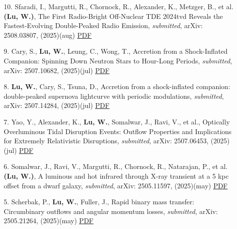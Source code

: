\begin{itemize}[leftmargin=0.65cm]
\vspace{-0.1cm}
\item[10.]{Sfaradi, I., Margutti, R., Chornock, R., Alexander, K., Metzger, B., et al. {\bf (Lu, W.)}, {The First Radio-Bright Off-Nuclear TDE 2024tvd Reveals the Fastest-Evolving Double-Peaked Radio Emission}, {\it submitted}, arXiv: 2508.03807, (2025)(aug) \href{https://ui.adsabs.harvard.edu/abs/2025arXiv250803807S}{\underline{PDF}}}

\vspace{-0.1cm}
\item[9.]{Cary, S., {\bf Lu, W.}, Leung, C., Wong, T., {Accretion from a Shock-Inflated Companion: Spinning Down Neutron Stars to Hour-Long Periods}, {\it submitted}, arXiv: 2507.10682, (2025)(jul) \href{https://ui.adsabs.harvard.edu/abs/2025arXiv250710682C}{\underline{PDF}}}

\vspace{-0.1cm}
\item[8.]{{\bf Lu, W.}, Cary, S., Tsuna, D., {Accretion from a shock-inflated companion: double-peaked supernova lightcurve with periodic modulations}, {\it submitted}, arXiv: 2507.14284, (2025)(jul) \href{https://ui.adsabs.harvard.edu/abs/2025arXiv250714284L}{\underline{PDF}}}

\vspace{-0.1cm}
\item[7.]{Yao, Y., Alexander, K., {\bf Lu, W.}, Somalwar, J., Ravi, V., et al., {Optically Overluminous Tidal Disruption Events: Outflow Properties and Implications for Extremely Relativistic Disruptions}, {\it submitted}, arXiv: 2507.06453, (2025)(jul) \href{https://ui.adsabs.harvard.edu/abs/2025arXiv250706453Y}{\underline{PDF}}}

\vspace{-0.1cm}
\item[6.]{Somalwar, J., Ravi, V., Margutti, R., Chornock, R., Natarajan, P., et al. {\bf (Lu, W.)}, {A luminous and hot infrared through X-ray transient at a 5 kpc offset from a dwarf galaxy}, {\it submitted}, arXiv: 2505.11597, (2025)(may) \href{https://ui.adsabs.harvard.edu/abs/2025arXiv250511597S}{\underline{PDF}}}

\vspace{-0.1cm}
\item[5.]{Scherbak, P., {\bf Lu, W.}, Fuller, J., {Rapid binary mass transfer: Circumbinary outflows and angular momentum losses}, {\it submitted}, arXiv: 2505.21264, (2025)(may) \href{https://ui.adsabs.harvard.edu/abs/2025arXiv250521264S}{\underline{PDF}}}


\end{itemize}
